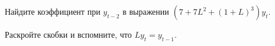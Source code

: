 
\begin{question}
Найдите коэффициент при \(y_{t-2}\) в выражении \((7 + 7L^2 + (1+L)^{3})y_t\).
\end{question}

\begin{solution}
Раскройте скобки и вспомните, что \(Ly_t = y_{t-1}\).
\end{solution}

